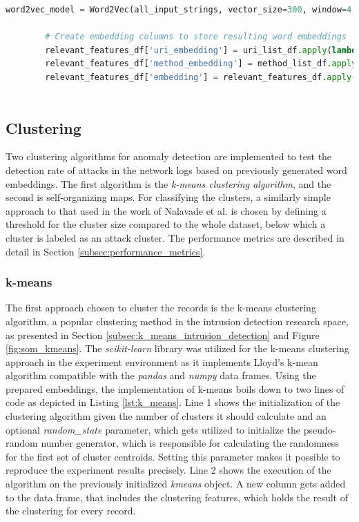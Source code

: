 \begin{minipage}\linewidth
	\begin{lstlisting}[language={python}, caption={Creation of Word2Vec model and word embeddings}, label={lst:word2vec}]
        word2vec_model = Word2Vec(all_input_strings, vector_size=300, window=4, min_count=1, workers=4)
        
        # Create embedding columns to store resulting word embeddings
        relevant_features_df['uri_embedding'] = uri_list_df.apply(lambda x: sum(word2vec_model.wv[t] for t in x))
        relevant_features_df['method_embedding'] = method_list_df.apply(lambda x: sum(word2vec_model.wv[t] for t in x))
        relevant_features_df['embedding'] = relevant_features_df.apply(lambda row: row['uri_embedding'] + row['method_embedding'], axis=1)
        
	\end{lstlisting}
\end{minipage}

\subsection{Clustering}
Two clustering algorithms for anomaly detection are implemented to test the detection rate of attacks in the network logs based on previously generated word embeddings. The first algorithm is the \emph{k-means clustering algorithm}, and the second is self-organizing maps. For classifying the clusters, a similarly simple approach to that used in the work of Nalavade et al. \cite{nalavade2014} is chosen by defining a threshold for the cluster size compared to the whole dataset, below which a cluster is labeled as an attack cluster. The performance metrics are described in detail in Section \ref{subsec:performance_metrics}.

\subsubsection{k-means}
The first approach chosen to cluster the records is the k-means clustering algorithm, a popular clustering method in the intrusion detection research space, as presented in Section \ref{subsec:k_means_intrusion_detection} and Figure \ref{fig:som_kmeans}. The \emph{scikit-learn} \cite{scikitlearn2011} library was utilized for the k-means clustering approach in the experiment environment as it implements Lloyd's k-mean algorithm compatible with the \emph{pandas} and \emph{numpy} data frames. Using the prepared embeddings, the implementation of k-means boils down to two lines of code as depicted in Listing \ref{lst:k_means}. Line 1 shows the initialization of the clustering algorithm given the number of clusters it should calculate and an optional \emph{random\_state} parameter, which gets utilized to initialize the pseudo-random number generator, which is responsible for calculating the randomness for the first set of cluster centroids. Setting this parameter makes it possible to reproduce the experiment results precisely. Line 2 shows the execution of the algorithm on the previously initialized \emph{kmeans} object. A new column gets added to the data frame, that includes the clustering features, which holds the result of the clustering for every record. 

